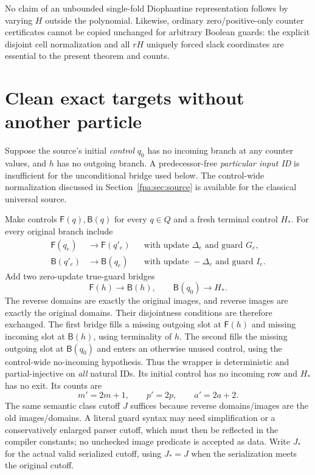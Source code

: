 \documentclass[11pt,a4paper]{article}
\numberwithin{equation}{section}
\begin{document}
No claim of an unbounded single-fold Diophantine representation follows by
varying $H$ outside the polynomial. Likewise, ordinary zero/positive-only
counter certificates cannot be copied unchanged for arbitrary Boolean guards:
the explicit disjoint cell normalization and all $rH$ uniquely forced slack
coordinates are essential to the present theorem and counts.
\section{Clean exact targets without another particle}\label{fpa:sec:clean}
Suppose the source's initial \emph{control} $q_0$ has no incoming branch at
any counter values, and $h$ has no outgoing branch. A predecessor-free
\emph{particular input ID} is insufficient for the unconditional bridge used
below. The control-wide normalization discussed in Section~\ref{fpa:sec:source}
is available for the classical universal source.

Make controls $\mathsf F(q),\mathsf B(q)$ for every $q\in Q$ and a fresh
terminal control $H_*$. For every original branch include
\begin{align*}
 \mathsf F(q_e)&\longrightarrow\mathsf F(q'_e)
       &&\text{with update }\Delta_e\text{ and guard }G_e,\\
 \mathsf B(q'_e)&\longrightarrow\mathsf B(q_e)
       &&\text{with update }-\Delta_e\text{ and guard }I_e.
\end{align*}
Add two zero-update true-guard bridges
\[
             \mathsf F(h)\longrightarrow\mathsf B(h),\qquad
             \mathsf B(q_0)\longrightarrow H_*.                    \tag{34}
\]
The reverse domains are exactly the original images, and reverse images are
exactly the original domains. Their disjointness conditions are therefore
exchanged. The first bridge fills a missing outgoing slot at $\mathsf F(h)$
and missing incoming slot at $\mathsf B(h)$, using terminality of $h$. The
second fills the missing outgoing slot at $\mathsf B(q_0)$ and enters an
otherwise unused control, using the control-wide no-incoming hypothesis.
Thus the wrapper is deterministic and partial-injective on \emph{all}
natural IDs. Its initial control has no incoming row and $H_*$ has no exit.
Its counts are
\[
                 m'=2m+1,\qquad p'=2p,\qquad a'=2a+2.              \tag{35}
\]
The same semantic class cutoff $J$ suffices because reverse domains/images
are the old images/domains. A literal guard syntax may need simplification
or a conservatively enlarged parser cutoff, which must then be reflected in
the compiler constants; no unchecked image predicate is accepted as data.
Write $J_*$ for the actual valid serialized cutoff, using $J_*=J$ when the
serialization meets the original cutoff.
\end{document}
